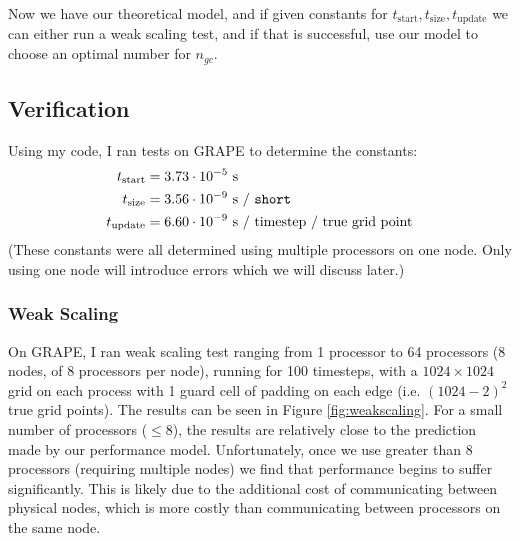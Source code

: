\documentclass[iop, apj]{emulateapj}
\begin{document}
Now we have our theoretical model, and if given constants for $t_\mathrm{start}, t_\mathrm{size}, t_\mathrm{update}$ we can either run a weak scaling test, and if that is successful, use our model to choose an optimal number for $n_{gc}$.

\subsection{Verification}

Using my code, I ran tests on GRAPE to determine the constants:
\begin{align}
	t_\mathrm{start} &= 3.73 \cdot 10^{-5} \text{ s}
	\\
	t_\mathrm{size} &= 3.56 \cdot 10^{-9} \text{ s / \texttt{short}}
	\\
	t_\mathrm{update} &=6.60 \cdot 10^{-9} \text{ s / timestep / true grid point}
\end{align}
(These constants were all determined using multiple processors on one node. Only using one node will introduce errors which we will discuss later.)

\subsubsection{Weak Scaling}
On GRAPE, I ran weak scaling test ranging from 1 processor to 64 processors (8 nodes, of 8 processors per node), running for 100 timesteps, with a $1024 \times 1024$ grid on each process with 1 guard cell of padding on each edge (i.e. $(1024 - 2)^2$ true grid points). The results can be seen in Figure \ref{fig:weakscaling}. For a small number of processors ($\leq 8$), the results are relatively close to the prediction made by our performance model.  Unfortunately, once we use greater than 8 processors (requiring multiple nodes) we find that performance begins to suffer significantly.  This is likely due to the additional cost of communicating between physical nodes, which is more costly than communicating between processors on the same node.
\end{document}
